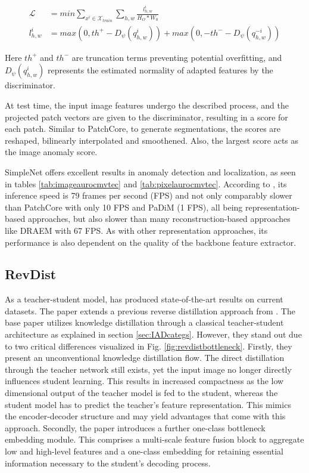 \begin{equation}
 \label{eq:simplenetloss}
 \begin{split}
 \mathcal{L} &= min \sum_{x^{i}\in \mathcal{X}_{train}} \sum_{h, w} \frac{l^{i}_{h,w}}{H_{O} * W_{0}} \\
 l^{i}_{h,w} &= max(0, th^{+} - D_{\psi}(q^{i}_{h,w})) + max(0, -th^{-} - D_{\psi}(q^{-i}_{h,w}))
 \end{split}
\end{equation} 

Here $th^{+}$ and $th^{-}$ are truncation terms preventing potential overfitting, and $D_{\psi}(q^{i}_{h,w})$ represents the estimated normality of adapted features by the discriminator.

At test time, the input image features undergo the described process, and the projected patch vectors are given to the discriminator, resulting in a score for each patch. Similar to 
PatchCore, to generate segmentations, the scores are reshaped, bilinearly interpolated and smoothened. Also, the largest score acts as the image anomaly score.

SimpleNet offers excellent results in anomaly detection and localization, as seen in tables \ref{tab:imageaurocmvtec} and \ref{tab:pixelaurocmvtec}. According to \cite{liu2023simplenet}, its inference speed is 79 frames per second (FPS) and 
not only comparably slower than PatchCore \cite{patchCore2022} with only 10 FPS 
and PaDiM \cite{Defard_2021PADIM} (1 FPS), all being representation-based approaches, but also slower than many reconstruction-based approaches like DRAEM with 67 FPS. As with other representation 
approaches, its performance is also dependent on the quality of the backbone feature extractor.


\subsection{RevDist}
\label{subsec:revdist}

As a teacher-student model, \cite{revdist2023} has produced state-of-the-art results on current datasets. The paper extends a previous reverse distillation approach from 
\cite{Deng_2022basicrevdist}. The base paper utilizes knowledge distillation through a classical teacher-student architecture as explained in section \ref{sec:IADcategs}. However, they stand out 
due to two critical differences visualized in Fig. \ref{fig:revdistbottleneck}. Firstly, they present an unconventional knowledge distillation flow. The direct distillation through the teacher network still exists, 
yet the input image no longer directly influences student learning. This results in increased compactness as the low dimensional output of the teacher model is fed to the student, 
whereas the student model has to predict the teacher's feature representation. This mimics the encoder-decoder structure and may yield advantages that come with this approach. Secondly, 
the paper introduces a further one-class bottleneck embedding module. This comprises a multi-scale feature fusion block to aggregate low and high-level features and a one-class embedding 
for retaining essential information necessary to the student's decoding process. 


